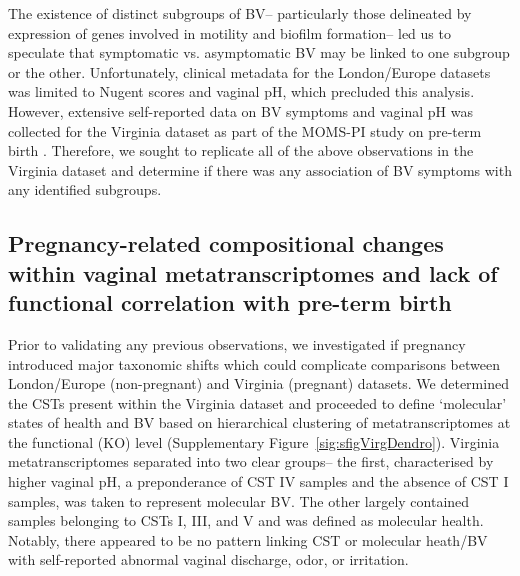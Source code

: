 \documentclass[sn-mathphys,Numbered]{sn-jnl}%
\begin{document}
The existence of distinct subgroups of BV-- particularly those delineated by expression of genes involved in motility and biofilm formation-- led us to speculate that symptomatic vs. asymptomatic BV may be linked to one subgroup or the other. Unfortunately, clinical metadata for the London/Europe datasets was limited to Nugent scores and vaginal pH, which precluded this analysis. However, extensive self-reported data on BV symptoms and vaginal pH was collected for the Virginia dataset as part of the MOMS-PI study on pre-term birth \citep{Fettweis:2019aa}. Therefore, we sought to replicate all of the above observations in the Virginia dataset and determine if there was any association of BV symptoms with any identified subgroups. 

\subsection{Pregnancy-related compositional changes within vaginal metatranscriptomes and lack of functional correlation with pre-term birth} \label{subsec:subsecPregVsNonpreg}

Prior to validating any previous observations, we investigated if pregnancy introduced major taxonomic shifts which could complicate comparisons between London/Europe (non-pregnant) and Virginia (pregnant) datasets. We determined the CSTs present within the Virginia dataset and proceeded to define `molecular' states of health and BV based on hierarchical clustering of metatranscriptomes at the functional (KO) level (Supplementary Figure~\ref{sig:sfigVirgDendro}). Virginia metatranscriptomes separated into two clear groups-- the first, characterised by higher vaginal pH, a preponderance of CST IV samples and the absence of CST I samples, was taken to represent molecular BV. The other largely contained samples belonging to CSTs I, III, and V and was defined as molecular health. Notably, there appeared to be no pattern linking CST or molecular heath/BV with self-reported abnormal vaginal discharge, odor, or irritation.
\end{document}
